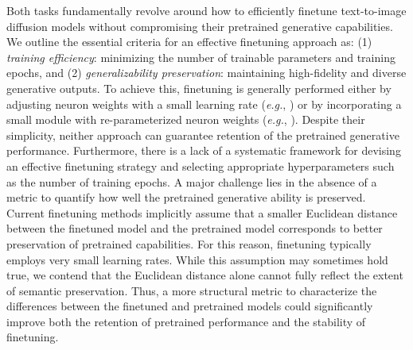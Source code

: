 Both tasks fundamentally revolve around how to efficiently finetune text-to-image diffusion models without compromising their pretrained generative capabilities. We outline the essential criteria for an effective finetuning approach as: (1) \emph{training efficiency}: minimizing the number of trainable parameters and training epochs, and (2) \emph{generalizability preservation}: maintaining high-fidelity and diverse generative outputs. To achieve this, finetuning is generally performed either by adjusting neuron weights with a small learning rate (\emph{e.g.}, \cite{ruiz2023dreambooth}) or by incorporating a small module with re-parameterized neuron weights (\emph{e.g.}, \cite{hulora2022,zhang2023adding}). Despite their simplicity, neither approach can guarantee retention of the pretrained generative performance. Furthermore, there is a lack of a systematic framework for devising an effective finetuning strategy and selecting appropriate hyperparameters such as the number of training epochs. A major challenge lies in the absence of a metric to quantify how well the pretrained generative ability is preserved. Current finetuning methods implicitly assume that a smaller Euclidean distance between the finetuned model and the pretrained model corresponds to better preservation of pretrained capabilities. For this reason, finetuning typically employs very small learning rates. While this assumption may sometimes hold true, we contend that the Euclidean distance alone cannot fully reflect the extent of semantic preservation. Thus, a more structural metric to characterize the differences between the finetuned and pretrained models could significantly improve both the retention of pretrained performance and the stability of finetuning.

